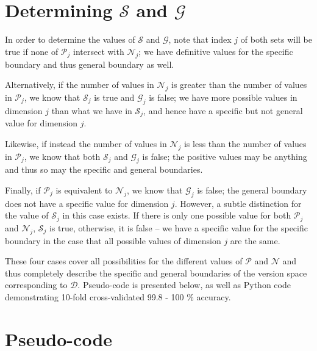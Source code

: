 \section*{Determining $\mathcal{S}$ and $\mathcal{G}$}

In order to determine the values of $\mathcal{S}$ and $\mathcal{G}$, note that index $j$ of both sets will be true if none of $\mathcal{P}_j$ intersect with $\mathcal{N}_j$; we have definitive values for the specific boundary and thus general boundary as well.  

Alternatively, if the number of values in $\mathcal{N}_j$ is greater than the number of values in $\mathcal{P}_j$, we know that $\mathcal{S}_j$ is true and $\mathcal{G}_j$ is false; we have more possible values in dimension $j$ than what we have in $\mathcal{S}_j$, and hence have a specific but not general value for dimension $j$.  

Likewise, if instead the number of values in $\mathcal{N}_j$ is less than the number of values in $\mathcal{P}_j$, we know that both $\mathcal{S}_j$ and $\mathcal{G}_j$ is false; the positive values may be anything and thus so may the specific and general boundaries.  

Finally, if $\mathcal{P}_j$ is equivalent to $\mathcal{N}_j$, we know that $\mathcal{G}_j$ is false; the general boundary does not have a specific value for dimension $j$.  However, a subtle distinction for the value of $\mathcal{S}_j$ in this case exists.  If there is only one possible value for both $\mathcal{P}_j$ and $\mathcal{N}_j$, $\mathcal{S}_j$ is true, otherwise, it is false -- we have a specific value for the specific boundary in the case that all possible values of dimension $j$ are the same.

These four cases cover all possibilities for the different values of $\mathcal{P}$ and $\mathcal{N}$ and thus completely describe the specific and general boundaries of the version space corresponding to $\mathcal{D}$.  Pseudo-code is presented below, as well as Python code demonstrating 10-fold cross-validated 99.8 - 100 \% accuracy.

\section*{Pseudo-code}

